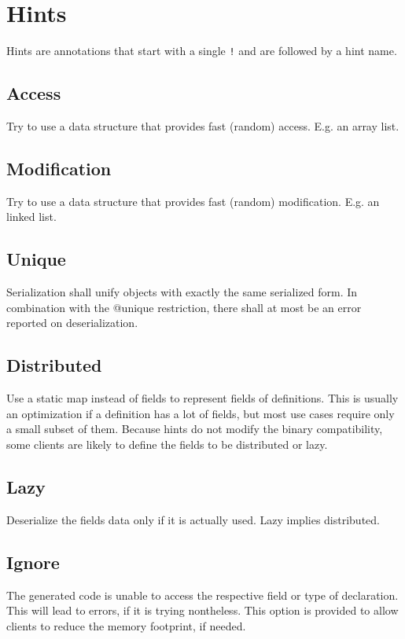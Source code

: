 \documentclass[a4paper,10pt]{article}
\begin{document}
\section{Hints}
\label{hints}

Hints are annotations that start with a single \verb/!/ and are followed by a hint name.

\subsection*{Access}
Try to use a data structure that provides fast (random) access. E.g. an array list.

\subsection*{Modification}
Try to use a data structure that provides fast (random) modification. E.g. an linked list.

\subsection*{Unique}
Serialization shall unify objects with exactly the same serialized form. In combination with the @unique restriction, there shall at most be an error reported on deserialization.

\subsection*{Distributed}
Use a static map instead of fields to represent fields of definitions. This is usually an optimization if a definition has a lot of fields, but most use cases require only a small subset of them. Because hints do not modify the binary compatibility, some clients are likely to define the fields to be distributed or lazy.

\subsection*{Lazy}
Deserialize the fields data only if it is actually used. Lazy implies distributed.

\subsection*{Ignore}
The generated code is unable to access the respective field or type of declaration. This will lead to errors, if it is trying nontheless. This option is provided to allow clients to reduce the memory footprint, if needed.
\end{document}
